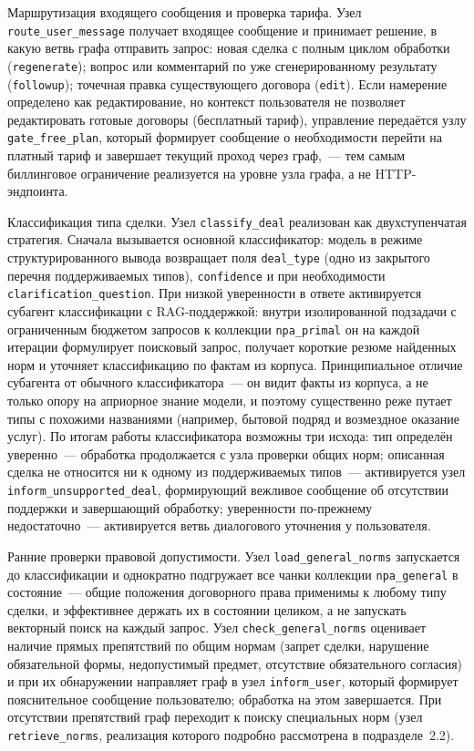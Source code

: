 Маршрутизация входящего сообщения и проверка тарифа. Узел \texttt{route\_user\_message} получает входящее сообщение и принимает решение, в какую ветвь графа отправить запрос: новая сделка с полным циклом обработки (\texttt{regenerate}); вопрос или комментарий по уже сгенерированному результату (\texttt{followup}); точечная правка существующего договора (\texttt{edit}). Если намерение определено как редактирование, но контекст пользователя не позволяет редактировать готовые договоры (бесплатный тариф), управление передаётся узлу \texttt{gate\_free\_plan}, который формирует сообщение о необходимости перейти на платный тариф и завершает текущий проход через граф,~--- тем самым биллинговое ограничение реализуется на уровне узла графа, а не HTTP-эндпоинта.

Классификация типа сделки. Узел \texttt{classify\_deal} реализован как двухступенчатая стратегия. Сначала вызывается основной классификатор: модель в режиме структурированного вывода возвращает поля \texttt{deal\_type} (одно из закрытого перечня поддерживаемых типов), \texttt{confidence} и при необходимости \texttt{clarification\_question}. При низкой уверенности в ответе активируется субагент классификации с RAG-поддержкой: внутри изолированной подзадачи с ограниченным бюджетом запросов к коллекции \texttt{npa\_primal} он на каждой итерации формулирует поисковый запрос, получает короткие резюме найденных норм и уточняет классификацию по фактам из корпуса. Принципиальное отличие субагента от обычного классификатора~--- он видит факты из корпуса, а не только опору на априорное знание модели, и поэтому существенно реже путает типы с похожими названиями (например, бытовой подряд и возмездное оказание услуг). По итогам работы классификатора возможны три исхода: тип определён уверенно~--- обработка продолжается с узла проверки общих норм; описанная сделка не относится ни к одному из поддерживаемых типов~--- активируется узел \texttt{inform\_unsupported\_deal}, формирующий вежливое сообщение об отсутствии поддержки и завершающий обработку; уверенности по-прежнему недостаточно~--- активируется ветвь диалогового уточнения у пользователя.

Ранние проверки правовой допустимости. Узел \texttt{load\_general\_norms} запускается до классификации и однократно подгружает все чанки коллекции \texttt{npa\_general} в состояние~--- общие положения договорного права применимы к любому типу сделки, и эффективнее держать их в состоянии целиком, а не запускать векторный поиск на каждый запрос. Узел \texttt{check\_general\_norms} оценивает наличие прямых препятствий по общим нормам (запрет сделки, нарушение обязательной формы, недопустимый предмет, отсутствие обязательного согласия) и при их обнаружении направляет граф в узел \texttt{inform\_user}, который формирует пояснительное сообщение пользователю; обработка на этом завершается. При отсутствии препятствий граф переходит к поиску специальных норм (узел \texttt{retrieve\_norms}, реализация которого подробно рассмотрена в подразделе~2.2).

